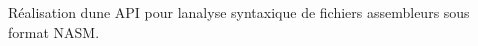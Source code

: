 Réalisation d\textquotesingle{}une A\+PI pour l\textquotesingle{}analyse syntaxique de fichiers assembleurs sous format N\+A\+SM. 